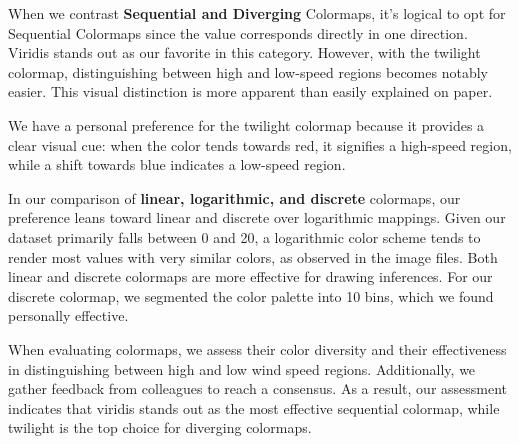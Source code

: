 \documentclass[conference]{IEEEtran}
\begin{document}

When we contrast \textbf{Sequential and Diverging} Colormaps, it's logical to opt for Sequential Colormaps since the value corresponds directly in one direction. Viridis stands out as our favorite in this category. However, with the twilight colormap, distinguishing between high and low-speed regions becomes notably easier. This visual distinction is more apparent than easily explained on paper.

We have a personal preference for the twilight colormap because it provides a clear visual cue: when the color tends towards red, it signifies a high-speed region, while a shift towards blue indicates a low-speed region.


In our comparison of \textbf{linear, logarithmic, and discrete} colormaps, our preference leans toward linear and discrete over logarithmic mappings. Given our dataset primarily falls between 0 and 20, a logarithmic color scheme tends to render most values with very similar colors, as observed in the image files. Both linear and discrete colormaps are more effective for drawing inferences. For our discrete colormap, we segmented the color palette into 10 bins, which we found personally effective.


When evaluating colormaps, we assess their color diversity and their effectiveness in distinguishing between high and low wind speed regions. Additionally, we gather feedback from colleagues to reach a consensus. As a result, our assessment indicates that viridis stands out as the most effective sequential colormap, while twilight is the top choice for diverging colormaps.
\end{document}
